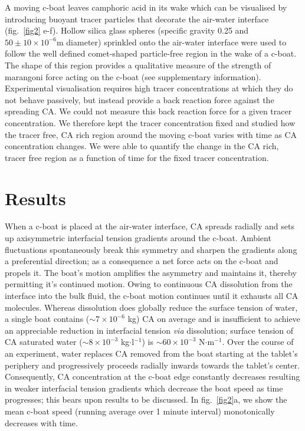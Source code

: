 \documentclass[journal=langd5, manuscript=article, layout=twocolumn]{achemso}
\begin{document}
A moving c-boat leaves camphoric acid in its wake which can be visualised by introducing buoyant tracer particles that decorate the air-water interface (fig.~\ref{fig2} e-f). Hollow silica glass spheres (specific gravity 0.25 and $50 \pm 10 \times 10^{-6}$m diameter) sprinkled onto the air-water interface were used to follow the well defined comet-shaped particle-free region in the wake of a c-boat. The shape of this region provides a qualitative measure of the strength of marangoni force acting on the c-boat (see supplementary information). Experimental visualisation requires high tracer concentrations at which they do not behave passively, but instead provide a back reaction force against the spreading CA. We could not measure this back reaction force for a given tracer concentration. We therefore kept the tracer concentration fixed and studied how the tracer free, CA rich region around the moving c-boat varies with time as CA concentration changes. We were able to quantify the change in the CA rich, tracer free region as a function of time for the fixed tracer concentration.

\section{Results}
\label{resultsec}
When a c-boat is placed at the air-water interface, CA spreads radially and sets up axisymmetric interfacial tension gradients around the c-boat. Ambient fluctuations spontaneously break this symmetry and sharpen the gradients along a preferential direction; as a consequence a net force acts on the c-boat and propels it. The boat's motion amplifies the asymmetry and maintains it, thereby permitting it's continued motion. Owing to continuous CA dissolution from the interface into the bulk fluid, the c-boat motion continues until it exhausts all CA molecules. Whereas dissolution does globally reduce the surface tension of water, a single boat contains  ($\sim 7 \times 10^{-6}$ kg) CA on average and is insufficient to achieve an appreciable reduction in interfacial tension {\it via} dissolution; surface tension of CA saturated water ($\sim 8 \times 10^{-3}$ kg$\cdot$l$^{-1}$) is $\sim 60\times 10^{-3}$ N$\cdot$m$^{-1}$. Over the course of an experiment, water replaces CA removed from the boat starting at the tablet's periphery and progressively proceeds radially inwards towards the tablet's center. Consequently, CA concentration at the c-boat edge constantly decreases resulting in weaker interfacial tension gradients which decrease the boat speed as time progresses; this bears upon results to be discussed. In fig.~\ref{fig2}a, we show the mean c-boat speed (running average over 1 minute interval) monotonically decreases with time.
\end{document}
